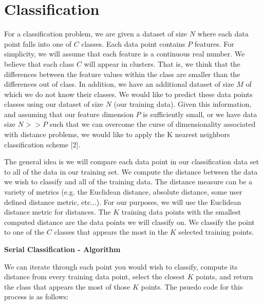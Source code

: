 \section{Classification}

\vspace{5 mm}
\noindent
For a classification problem, we are given a dataset of size $N$ where each 
data point falls into one of $C$ classes. Each data point contains $P$ features. 
For simplicity, we will assume that each feature is a continuous real number. 
We believe that each class $C$ will appear in clusters. That is, we think that 
the differences between the feature values within the class are smaller than 
the differences out of class. In addition, we have an additional dataset of 
size $M$ of which we do not know their classes. We would like to predict these 
data points classes using our dataset of size $N$ (our training data). Given 
this information, and assuming that our feature dimension $P$ is sufficiently 
small, or we have data size $N >> P$ such that we can overcome the curse of 
dimensionality associated with distance problems, we would like to apply the 
K nearest neighbors classification scheme [2].

\vspace{5 mm}
\noindent
The general idea is we will compare each data point in our classification data 
set to all of the data in our training set. We compute the distance between 
the data we wish to classify and all of the training data. The distance measure 
can be a variety of metrics (e.g. the Euclidean distance, absolute distance, 
some user defined distance metric, etc...). For our purposes, we will use the 
Euclidean distance metric for distances. The $K$ training data points with the 
smallest computed distance are the data points we will classify on. We classify 
the point to one of the $C$ classes that appears the most in the $K$ selected 
training points.

\vspace{5 mm}
\noindent
\textbf{Serial Classification - Algorithm}

\vspace{5 mm}
\noindent
We can iterate through each point you would wish to classify, compute its 
distance from every training data point, select the closest $K$ points, and 
return the class that appears the most of those $K$ points. The psuedo code for 
this process is as follows:

\newpage

